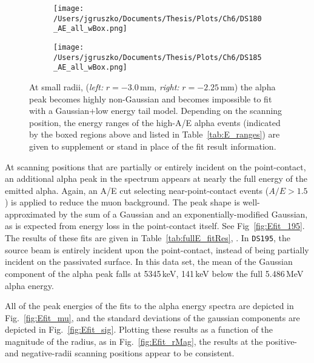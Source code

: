 \begin{figure*}[]
 \centering
 \begin{subfigure}[]{.45\textwidth}
 \texttt{[image: /Users/jgruszko/Documents/Thesis/Plots/Ch6/DS180\_AE\_all\_wBox.png]}
\end{subfigure}
 \begin{subfigure}[]{.45\textwidth}
 \texttt{[image: /Users/jgruszko/Documents/Thesis/Plots/Ch6/DS185\_AE\_all\_wBox.png]}
\end{subfigure}
 \caption[Plots of A/E vs. E for small-magnitude radii scans.]{At small radii, ({\it left:} $r=-3.0$\,mm, {\it right:} $r=-2.25$\,mm) the alpha peak becomes highly non-Gaussian and becomes impossible to fit with a Gaussian+low energy tail model. Depending on the scanning position, the energy ranges of the high-A/E alpha events (indicated by the boxed regions above and listed in Table~\ref{tab:E_ranges}) are given to supplement or stand in place of the fit result information.} 
 \label{fig:AEvE}
\end{figure*}

At scanning positions that are partially or entirely incident on the point-contact, an additional alpha peak in the spectrum appears at nearly the full energy of the emitted alpha. Again, an A/E cut selecting near-point-contact events ($A/E>1.5$) is applied to reduce the muon background. The peak shape is well-approximated by the sum of a Gaussian and an exponentially-modified Gaussian, as is expected from energy loss in the point-contact itself. See Fig~\ref{fig:Efit_195}. The results of these fits are given in Table~\ref{tab:fullE_fitRes}, . In {\tt DS195}, the source beam is entirely incident upon the point-contact, instead of being partially incident on the passivated surface. In this data set, the mean of the Gaussian component of the alpha peak falls at 5345\,keV, 141\,keV below the full 5.486\,MeV alpha energy. 

All of the peak energies of the fits to the alpha energy spectra are depicted in Fig.~\ref{fig:Efit_mu}, and the standard deviations of the gaussian components are depicted in Fig.~\ref{fig:Efit_sig}. Plotting these results as a function of the magnitude of the radius, as in Fig.~\ref{fig:Efit_rMag}, the results at the positive- and negative-radii scanning positions appear to be consistent. 

